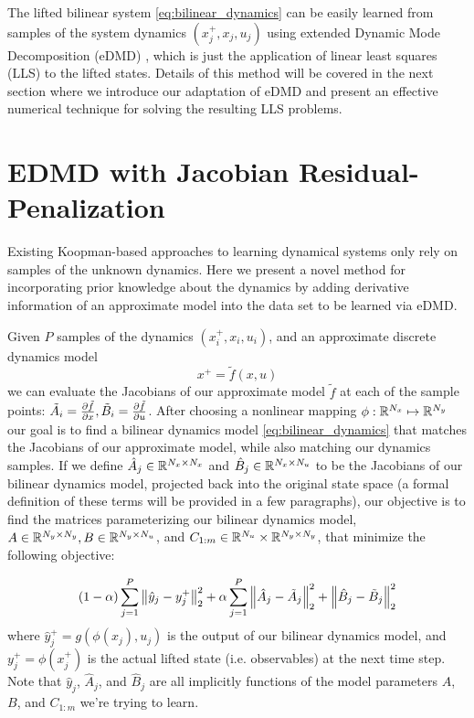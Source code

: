 \documentclass{article}
\begin{document}
The lifted bilinear system \eqref{eq:bilinear_dynamics} can be easily learned from samples
of the system dynamics $(x_j^+,x_j,u_j)$ using extended Dynamic Mode Decomposition (eDMD)
\cite{Williams2015}, which is just the application of linear least squares (LLS) to the
lifted states. Details of this method will be covered in the next section where we
introduce our adaptation of eDMD and present an effective numerical technique for solving
the resulting LLS problems.


\section{EDMD with Jacobian Residual-Penalization} \label{sec:methodology}
Existing Koopman-based approaches to learning dynamical systems only rely on samples of
the unknown dynamics. Here we present a novel method for incorporating prior knowledge
about the dynamics by adding derivative information of an approximate model into the data
set to be learned via eDMD.

Given $P$ samples of the dynamics $(x_i^+, x_i, u_i)$, and an approximate discrete
dynamics model 
\begin{equation}
  x^+ = \tilde{f}(x,u)
\end{equation}
we can evaluate the Jacobians of our approximate model $\tilde{f}$ at each of the sample
points: $\tilde{A}_i = \pdv{\tilde{f}}{x}, \tilde{B}_i = \pdv{\tilde{f}}{u}$. After
choosing a nonlinear mapping $\phi : \mathbb{R}^{N_x} \mapsto \mathbb{R}^{N_y}$ our goal is to find a
bilinear dynamics model \eqref{eq:bilinear_dynamics} that matches the Jacobians of our
approximate model, while also matching our dynamics samples. If we define $\hat{A}_j \in
\mathbb{R}^{N_x \times N_x}$ and $\hat{B}_j \in \mathbb{R}^{N_x \times N_u}$ to be the Jacobians of our
bilinear dynamics model, projected back into the original state space (a formal definition
of these terms will be provided in a few paragraphs), our objective is to find the
matrices parameterizing our bilinear dynamics model, $A \in \mathbb{R}^{N_y \times N_y},B \in
\mathbb{R}^{N_y \times N_u}$, and $C_{1:m} \in \mathbb{R}^{N_u} \times \mathbb{R}^{N_y \times N_y}$, that minimize
the following objective:

\begin{equation} \label{eq:lls_objective}
  (1- \alpha) \sum_{j=1}^P \norm{\hat{y}_j - y_j^+}_2^2 + 
  \alpha  \sum_{j=1}^P \norm{\hat{A}_j - \tilde{A}_j}_2^2 + 
  \norm{\hat{B}_j - \tilde{B}_j}_2^2 
\end{equation}
where $\hat{y}_j^+ = g\left(\phi(x_j), u_j\right)$ is the output of our bilinear dynamics
model, and $y_j^+ = \phi(x_j^+)$ is the actual lifted state (i.e. observables) at the next
time step. Note that $\hat{y}_j$, $\hat{A}_j$, and $\hat{B}_j$ are all implicitly
functions of the model parameters $A$, $B$, and $C_{1:m}$ we're trying to learn.
\end{document}
